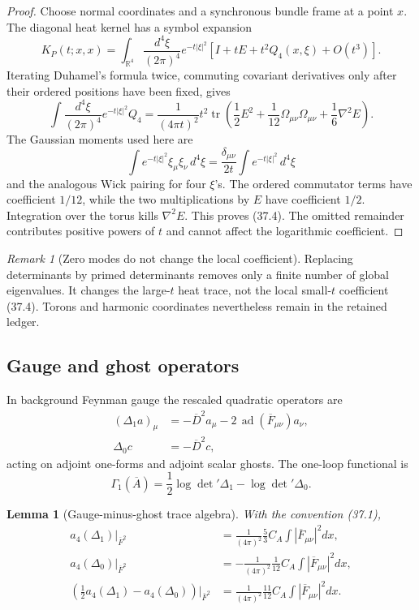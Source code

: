 \documentclass[11pt,oneside]{book}
\newtheorem{lemma}[theorem]{Lemma}
\theoremstyle{definition}
\theoremstyle{remark}
\newtheorem{remark}[theorem]{Remark}
\begin{document}
\begin{proof}
Choose normal coordinates and a synchronous bundle frame at a point
\(x\).  The diagonal heat kernel has a symbol expansion
\[
 K_P(t;x,x)
 =
 \int_{\mathbb R^4}\frac{d^4\xi}{(2\pi)^4}
 e^{-t|\xi|^2}
 \left[I+tE+t^2Q_4(x,\xi)+O(t^3)\right].
\]
Iterating Duhamel's formula twice, commuting covariant derivatives
only after their ordered positions have been fixed, gives
\[
 \int\frac{d^4\xi}{(2\pi)^4}e^{-t|\xi|^2}Q_4
 =
 \frac1{(4\pi t)^2}t^2
 \operatorname{tr}\left(
 \frac12E^2+\frac1{12}\Omega_{\mu\nu}\Omega_{\mu\nu}
 +\frac16\nabla^2E
 \right).
\]
The Gaussian moments used here are
\[
 \int e^{-t|\xi|^2}\xi_\mu\xi_\nu\,d^4\xi
 =
 \frac{\delta_{\mu\nu}}{2t}
 \int e^{-t|\xi|^2}\,d^4\xi
\]
and the analogous Wick pairing for four \(\xi\)'s.  The ordered
commutator terms have coefficient \(1/12\), while the two
multiplications by \(E\) have coefficient \(1/2\).  Integration over
the torus kills \(\nabla^2E\).  This proves (37.4).  The omitted
remainder contributes positive powers of \(t\) and cannot affect the
logarithmic coefficient.
\end{proof}

\begin{remark}[Zero modes do not change the local coefficient]
\label{rem:e8v37-zero-modes}
Replacing determinants by primed determinants removes only a finite
number of global eigenvalues.  It changes the large-\(t\) heat trace,
not the local small-\(t\) coefficient (37.4).  Torons and harmonic
coordinates nevertheless remain in the retained ledger.
\end{remark}

\subsection{Gauge and ghost operators}

In background Feynman gauge the rescaled quadratic operators are
\[
\begin{split}
 (\Delta_1a)_\mu
 &=
 -\overline D^2a_\mu
 -2\,\operatorname{ad}(\overline F_{\mu\nu})a_\nu,\\
 \Delta_0c&=-\overline D^2c,                                    \tag{37.5}
\end{split}
\]
acting on adjoint one-forms and adjoint scalar ghosts.  The one-loop
functional is
\[
 \Gamma_1(\overline A)
 =
 \frac12\log\det{}'\Delta_1
 -\log\det{}'\Delta_0.                                          \tag{37.6}
\]

\begin{lemma}[Gauge-minus-ghost trace algebra]
\label{lem:e8v37-trace-algebra}
With the convention (37.1),
\[
\begin{split}
 a_4(\Delta_1)\big|_{\overline F^2}
 &=
 \frac1{(4\pi)^2}\frac53 C_A
 \int|\overline F_{\mu\nu}|^2dx,\\
 a_4(\Delta_0)\big|_{\overline F^2}
 &=
 -\frac1{(4\pi)^2}\frac1{12}C_A
 \int|\overline F_{\mu\nu}|^2dx,                                \tag{37.7}\\
 \left(\frac12a_4(\Delta_1)-a_4(\Delta_0)\right)
 \big|_{\overline F^2}
 &=
 \frac1{(4\pi)^2}\frac{11}{12}C_A
 \int|\overline F_{\mu\nu}|^2dx.
\end{split}
\]
\end{lemma}
\end{document}
